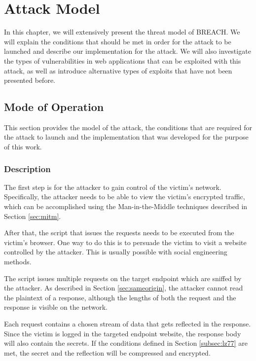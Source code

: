 \chapter{Attack Model}\label{ch:attack}

In this chapter, we will extensively present the threat model of BREACH. We will
explain the conditions that should be met in order for the attack to be
launched and describe our implementation for the attack. We will also
investigate the types of vulnerabilities in web applications that can be
exploited with this attack, as well as introduce alternative types of exploits
that have not been presented before.

\section{Mode of Operation}\label{sec:mo}

This section provides the model of the attack, the conditions that are required
for the attack to launch and the implementation that was developed for the
purpose of this work.

\subsection{Description}

The first step is for the attacker to gain control of the victim's network.
Specifically, the attacker needs to be able to view the victim's encrypted
traffic, which can be accomplished using the Man-in-the-Middle techniques
described in Section \ref{sec:mitm}.

After that, the script that issues the requests needs to be executed from the
victim's browser. One way to do this is to persuade the victim to visit a
website controlled by the attacker. This is usually possible with social
engineering methods.

The script issues multiple requests on the target endpoint which are sniffed by
the attacker. As described in Section \ref{sec:sameorigin}, the attacker cannot
read the plaintext of a response, although the lengths of both the request and
the response is visible on the network.

Each request contains a chosen stream of data that gets reflected in the
response. Since the victim is logged in the targeted endpoint website, the
response body will also contain the secrets. If the conditions defined in
Section \ref{subsec:lz77} are met, the secret and the reflection will be
compressed and encrypted.

